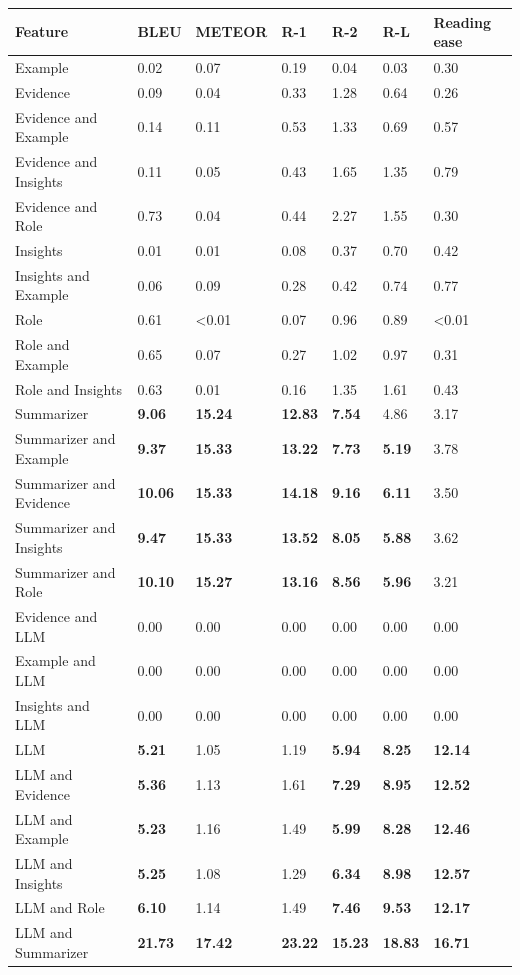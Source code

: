 \begin{tabular}{|l|l|l|l|l|l|l|}
\hline
\textbf{Feature} & BLEU & METEOR & R-1 & R-2 & R-L & Reading ease \\
 \hline
 Example & 0.02 & 0.07 & 0.19 & 0.04 & 0.03 & 0.30 \\
 \hline
 Evidence & 0.09 & 0.04 & 0.33 & 1.28 & 0.64 & 0.26 \\
 \hline
 Evidence and Example & 0.14 & 0.11 & 0.53 & 1.33 & 0.69 & 0.57 \\
 \hline
 Evidence and Insights & 0.11 & 0.05 & 0.43 & 1.65 & 1.35 & 0.79 \\
 \hline
 Evidence and Role & 0.73 & 0.04 & 0.44 & 2.27 & 1.55 & 0.30 \\
 \hline
 Insights & 0.01 & 0.01 & 0.08 & 0.37 & 0.70 & 0.42 \\
 \hline
 Insights and Example & 0.06 & 0.09 & 0.28 & 0.42 & 0.74 & 0.77 \\
 \hline
 Role & 0.61 & \textless{}0.01 & 0.07 & 0.96 & 0.89 & \textless{}0.01 \\
 \hline
 Role and Example & 0.65 & 0.07 & 0.27 & 1.02 & 0.97 & 0.31 \\
 \hline
 Role and Insights & 0.63 & 0.01 & 0.16 & 1.35 & 1.61 & 0.43 \\
 \hline
 Summarizer & \textbf{9.06} & \textbf{15.24} & \textbf{12.83} & \textbf{7.54} & 4.86 & 3.17 \\
 \hline
 Summarizer and Example & \textbf{9.37} & \textbf{15.33} & \textbf{13.22} & \textbf{7.73} & \textbf{5.19} & 3.78 \\
 \hline
 Summarizer and Evidence & \textbf{10.06} & \textbf{15.33} & \textbf{14.18} & \textbf{9.16} & \textbf{6.11} & 3.50 \\
 \hline
 Summarizer and Insights & \textbf{9.47} & \textbf{15.33} & \textbf{13.52} & \textbf{8.05} & \textbf{5.88} & 3.62 \\
 \hline
 Summarizer and Role & \textbf{10.10} & \textbf{15.27} & \textbf{13.16} & \textbf{8.56} & \textbf{5.96} & 3.21 \\
 \hline
 Evidence and LLM & 0.00 & 0.00 & 0.00 & 0.00 & 0.00 & 0.00 \\
 \hline
 Example and LLM & 0.00 & 0.00 & 0.00 & 0.00 & 0.00 & 0.00 \\
 \hline
 Insights and LLM & 0.00 & 0.00 & 0.00 & 0.00 & 0.00 & 0.00 \\
 \hline
 LLM & \textbf{5.21} & 1.05 & 1.19 & \textbf{5.94} & \textbf{8.25} & \textbf{12.14} \\
 \hline
 LLM and Evidence & \textbf{5.36} & 1.13 & 1.61 & \textbf{7.29} & \textbf{8.95} & \textbf{12.52} \\
 \hline
 LLM and Example & \textbf{5.23} & 1.16 & 1.49 & \textbf{5.99} & \textbf{8.28} & \textbf{12.46} \\
 \hline
 LLM and Insights & \textbf{5.25} & 1.08 & 1.29 & \textbf{6.34} & \textbf{8.98} & \textbf{12.57} \\
 \hline
 LLM and Role & \textbf{6.10} & 1.14 & 1.49 & \textbf{7.46} & \textbf{9.53} & \textbf{12.17} \\
 \hline
 LLM and Summarizer & \textbf{21.73} & \textbf{17.42} & \textbf{23.22} & \textbf{15.23} & \textbf{18.83} & \textbf{16.71} \\
\hline
\end{tabular}

